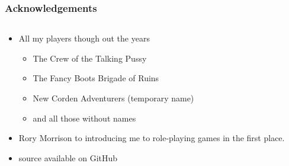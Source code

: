 \documentclass{beamer}\usepackage{graphicx, color}
\begin{document}
\begin{frame}
  \frametitle{Acknowledgements}

  \begin{columns}
    \begin{column}{0.5\textwidth}
      \begin{itemize}
        \item All my players though out the years
          \begin{itemize}
            \item The Crew of the Talking Pussy
            \item The Fancy Boots Brigade of Ruins
            \item New Corden Adventurers (temporary name)
            \item and all those without names
          \end{itemize}
        \item Rory Morrison to introducing me to role-playing games in the first place.
        \item \footnotesize{source available on GitHub}
      \end{itemize}

    \end{column}


\end{columns}
\end{frame}
\end{document}
